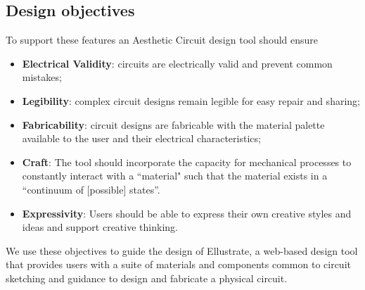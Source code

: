 \documentclass{sigchi}
\begin{document}
\subsection{Design objectives}
  To support these features an Aesthetic Circuit design tool should ensure 
    \begin{itemize}
        \item {\bf Electrical Validity}: circuits are electrically valid and prevent common mistakes;
        \item {\bf Legibility}: complex circuit designs remain legible for easy repair and sharing;
        \item {\bf Fabricability}: circuit designs are fabricable with the material palette available to the user and their electrical characteristics;
        \item {\bf Craft}: The tool should incorporate the capacity for mechanical processes to constantly interact with a ``material"  such that the material exists in a ``continuum of [possible] states''\cite{mccullough1998abstracting}. 
        \item {\bf Expressivity}: Users should be able to express their own creative styles and ideas and support creative thinking. 
    \end{itemize}
We use these objectives to guide the design of Ellustrate, a web-based design tool that provides users with a suite of materials and components common to circuit sketching and guidance to design and fabricate a physical circuit.
\end{document}
